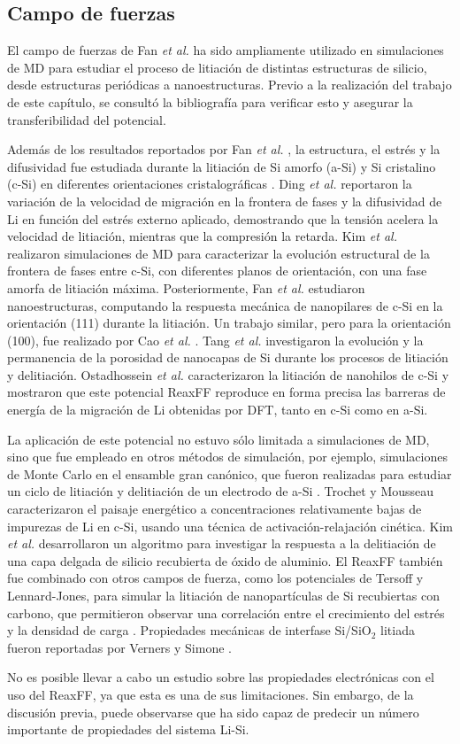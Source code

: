 \subsection{Campo de fuerzas}

El campo de fuerzas de Fan \textit{et al.} ha sido ampliamente utilizado en 
simulaciones de MD para estudiar el proceso de litiación de distintas estructuras
de silicio, desde estructuras periódicas a nanoestructuras. Previo a la 
realización del trabajo de este capítulo, se consultó la bibliografía para 
verificar esto y asegurar la transferibilidad del potencial. 

Además de los resultados reportados por Fan \textit{et al.} \cite{fan2013}, 
la estructura, el estrés y la difusividad fue estudiada durante la litiación de 
Si amorfo (a-Si) y Si cristalino (c-Si) en diferentes orientaciones 
cristalográficas \cite{chen2020, kim2015}. Ding \textit{et al.} \cite{ding2017} 
reportaron la variación de la velocidad de migración en la frontera de fases y la 
difusividad de Li en función del estrés externo aplicado, demostrando que la 
tensión acelera la velocidad de litiación, mientras que la compresión la retarda. 
Kim \textit{et al.} \cite{kim2014} realizaron simulaciones de MD para caracterizar 
la evolución estructural de la frontera de fases entre c-Si, con diferentes planos 
de orientación, con una fase amorfa de litiación máxima. Posteriormente, Fan 
\textit{et al.} \cite{fan2018} estudiaron nanoestructuras, computando la respuesta
mecánica de nanopilares de c-Si en la orientación (111) durante la litiación.
Un trabajo similar, pero para la orientación (100), fue realizado por Cao 
\textit{et al.} \cite{cao2019}. Tang \textit{et al.} \cite{tang2019} investigaron
la evolución y la permanencia de la porosidad de nanocapas de Si durante los 
procesos de litiación y delitiación. Ostadhossein \textit{et al.} 
\cite{ostadhossein2015} caracterizaron la litiación de nanohilos de c-Si y mostraron
que este potencial ReaxFF reproduce en forma precisa las barreras de energía de 
la migración de Li obtenidas por DFT, tanto en c-Si como en a-Si.

La aplicación de este potencial no estuvo sólo limitada a simulaciones de MD, 
sino que fue empleado en otros métodos de simulación, por ejemplo, simulaciones 
de Monte Carlo en el ensamble gran canónico, que fueron realizadas para estudiar 
un ciclo de litiación y delitiación de un electrodo de a-Si \cite{basu2019}. 
Trochet y Mousseau \cite{trochet2017} caracterizaron el paisaje energético a 
concentraciones relativamente bajas de impurezas de Li en c-Si, usando una 
técnica de activación-relajación cinética. Kim \textit{et al.} \cite{kim2017} 
desarrollaron un algoritmo para investigar la respuesta a la delitiación de una 
capa delgada de silicio recubierta de óxido de aluminio. El ReaxFF también fue 
combinado con otros campos de fuerza, como los potenciales de Tersoff y 
Lennard-Jones, para simular la litiación de nanopartículas de Si recubiertas con 
carbono, que permitieron observar una correlación entre el crecimiento del 
estrés y la densidad de carga \cite{zheng2019,zheng2020}. Propiedades mecánicas 
de interfase Si/SiO$_2$ litiada fueron reportadas por Verners y 
Simone \cite{verners2019}. 

No es posible llevar a cabo un estudio sobre las propiedades electrónicas con el 
uso del ReaxFF, ya que esta es una de sus limitaciones. Sin embargo, de la 
discusión previa, puede observarse que ha sido capaz de predecir un número 
importante de propiedades del sistema Li-Si.
